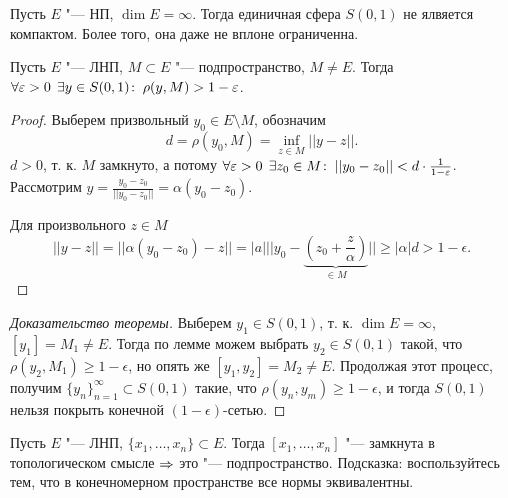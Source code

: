\documentclass[main]{subfiles}
\begin{document}
\begin{theorem}[Ф. Рисс]
  Пусть \( E \) "--- НП, \( \dim E = \infty \).
  Тогда единичная сфера \( S(0, 1) \) не ялвяется компактом.
  Более того, она даже не вплоне ограниченна.
\end{theorem}

\begin{lemma}
  Пусть \( E \) "--- ЛНП, \( M \subset E \) "--- подпространство,
  \( M \ne E \). Тогда \( \forall {\varepsilon> 0} \; \, \exists y \in S(0, 1) \colon \:
  \rho(y, M) > 1 - \varepsilon \).
\end{lemma}
\begin{proof}
  Выберем призвольный \( y_0 \in E \setminus M \),
  обозначим \[ d = \rho(y_0, M) = \inf_{z \in M} ||y - z||. \]
  \( d > 0 \), т. к. \( M \) замкнуто, а потому
  \( \forall {\varepsilon> 0} \; \, \exists z_0 \in M \colon \: ||y_0 - z_0|| <
  d \cdot \frac{1}{1 - \varepsilon} \).
  Рассмотрим \( y = \frac{y_0 - z_0}{||y_0 - z_0||} = \alpha (y_0 - z_0) \).

  Для произвольного \( z \in M \)
  \[ ||y - z|| = ||\alpha(y_0 - z_0) - z|| =
  |a| ||y_0 - \underbrace{(z_0 + \frac{z}{\alpha})}_{\in M}||
  \ge |\alpha| d > 1 - \epsilon. \]
\end{proof}

\begin{proof}[Доказательство теоремы]
  Выберем \( y_1 \in S(0, 1) \), т. к. \( \dim E = \infty \),
  \( [y_1] = M_1 \ne E \). Тогда по лемме можем выбрать
  \( y_2 \in S(0, 1) \) такой, что \( \rho(y_2, M_1) \ge 1 - \epsilon \),
  но опять же \( [y_1, y_2] = M_2 \ne E \). Продолжая этот процесс,
  получим \( \{ y_n \}_{n = 1}^\infty \subset S(0, 1) \) такие, что
  \( \rho(y_n, y_m) \ge 1 - \epsilon \), и тогда \( S(0, 1) \)
  нельзя покрыть конечной \( (1 - \epsilon) \)-сетью.
\end{proof}

\begin{exercise}
  Пусть \( E \) "--- ЛНП, \( \{ x_1, \dots, x_n \} \subset E \).
  Тогда \( [x_1, \dots, x_n] \) "--- замкнута в топологическом
  смысле \( \Rightarrow \) это "--- подпространство.
  Подсказка: воспользуйтесь тем, что в конечномерном пространстве
  все нормы эквивалентны.
\end{exercise}
\end{document}
